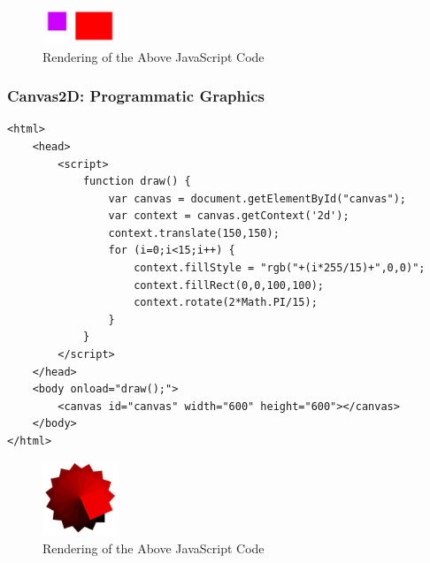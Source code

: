 \documentclass[a4paper,11pt]{article}
\begin{document}
\begin{figure}[H]
    \centering
    \includegraphics[width=0.2\textwidth]{images/canvas2d_scaling.png}
    \caption{Rendering of the Above JavaScript Code}
\end{figure}

\subsubsection{Canvas2D: Programmatic Graphics}
\begin{verbatim}
<html>
    <head>
        <script>
            function draw() {
                var canvas = document.getElementById("canvas");
                var context = canvas.getContext('2d');
                context.translate(150,150);
                for (i=0;i<15;i++) {
                    context.fillStyle = "rgb("+(i*255/15)+",0,0)";
                    context.fillRect(0,0,100,100);
                    context.rotate(2*Math.PI/15);
                }
            }
        </script>
    </head>
    <body onload="draw();">
        <canvas id="canvas" width="600" height="600"></canvas>
    </body>
</html>
\end{verbatim}

\begin{figure}[H]
    \centering
    \includegraphics[width=0.2\textwidth]{images/canvas2d_programmatic_graphics.png}
    \caption{Rendering of the Above JavaScript Code}
\end{figure}
\end{document}
